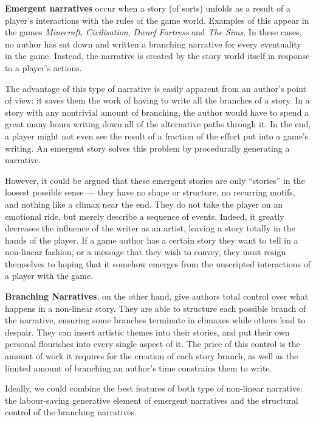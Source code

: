 \textbf{Emergent narratives} occur when a story (of sorts) unfolds as a result of a player's interactions with the rules of the game world. Examples of this appear in the games \emph{Minecraft}, \emph{Civilisation}, \emph{Dwarf Fortress} and \emph{The Sims}. In these cases, no author has sat down and written a branching narrative for every eventuality in the game. Instead, the narrative is created by the story world itself in response to a player's actions.

The advantage of this type of narrative is easily apparent from an author's point of view: it saves them the work of having to write all the branches of a story. In a story with any nontrivial amount of branching, the author would have to spend a great many hours writing down all of the alternative paths through it. In the end, a player might not even see the result of a fraction of the effort put into a game's writing. An emergent story solves this problem by procedurally generating a narrative.

However, it could be argued that these emergent stories are only ``stories'' in the loosest possible sense --- they have no shape or structure, no recurring motifs, and nothing like a climax near the end. They do not take the player on an emotional ride, but merely describe a sequence of events. Indeed, it greatly decreases the influence of the writer as an artist, leaving a story totally in the hands of the player. If a game author has a certain story they want to tell in a non-linear fashion, or a message that they wish to convey, they must resign themselves to hoping that it somehow emerges from the unscripted interactions of a player with the game.

\textbf{Branching Narratives}, on the other hand, give authors total control over what happens in a non-linear story. They are able to structure each possible branch of the narrative, ensuring some branches terminate in climaxes while others lead to despair. They can insert artistic themes into their stories, and put their own personal flourishes into every single aspect of it. The price of this control is the amount of work it requires for the creation of each story branch, as well as the limited amount of branching an author's time constrains them to write.

Ideally, we could combine the best features of both type of non-linear narrative: the labour-saving generative element of emergent narratives and the structural control of the branching narratives.

